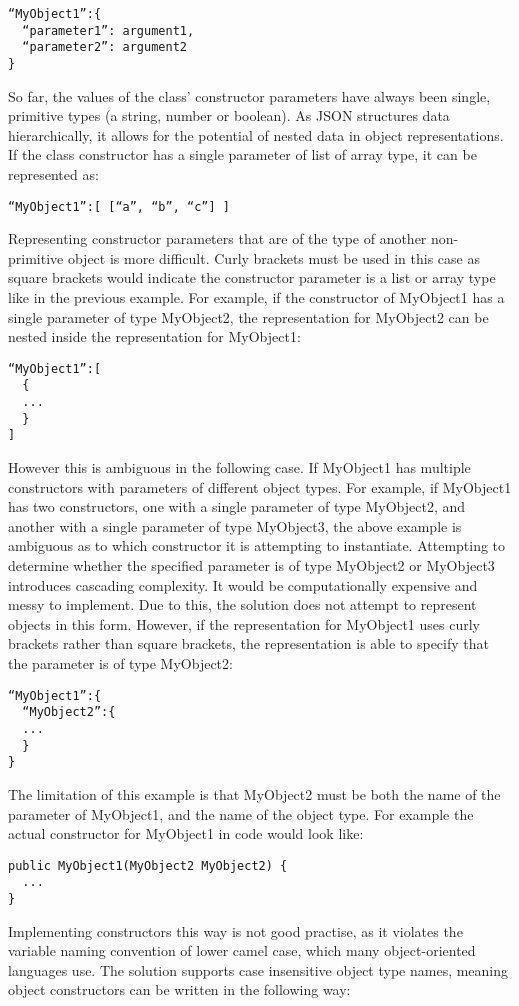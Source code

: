\begin{verbatim}
“MyObject1”:{
  “parameter1”: argument1,
  “parameter2”: argument2
}
\end{verbatim}
So far, the values of the class’ constructor parameters have always been single, primitive types (a string, number or boolean). As JSON structures data hierarchically, it allows for the potential of nested data in object representations. If the class constructor has a single parameter of list of array type, it can be represented as:
\begin{verbatim}
“MyObject1”:[ [“a”, “b”, “c”] ]
\end{verbatim}
Representing constructor parameters that are of the type of another non-primitive object is more difficult. Curly brackets must be used in this case as square brackets would indicate the constructor parameter is a list or array type like in the previous example. For example, if the constructor of MyObject1 has a single parameter of type MyObject2, the representation for MyObject2 can be nested inside the representation for MyObject1:
\begin{verbatim}
“MyObject1”:[
  {
  ...
  }
]
\end{verbatim}
However this is ambiguous in the following case. If MyObject1 has multiple constructors with parameters of different object types. For example, if MyObject1 has two constructors, one with a single parameter of type MyObject2, and another with a single parameter of type MyObject3, the above example is ambiguous as to which constructor it is attempting to instantiate. Attempting to determine whether the specified parameter is of type MyObject2 or MyObject3 introduces cascading complexity. It would be computationally expensive and messy to implement. Due to this, the solution does not attempt to represent objects in this form. However, if the representation for MyObject1 uses curly brackets rather than square brackets, the representation is able to specify that the parameter is of type MyObject2:
\begin{verbatim}
“MyObject1”:{
  “MyObject2”:{
  ...
  }
}
\end{verbatim}
The limitation of this example is that MyObject2 must be both the name of the parameter of MyObject1, and the name of the object type. For example the actual constructor for MyObject1 in code would look like:
\begin{verbatim}
public MyObject1(MyObject2 MyObject2) {
  ...
}
\end{verbatim}
Implementing constructors this way is not good practise, as it violates the variable naming convention of lower camel case, which many object-oriented languages use. The solution supports case insensitive object type names, meaning object constructors can be written in the following way:
